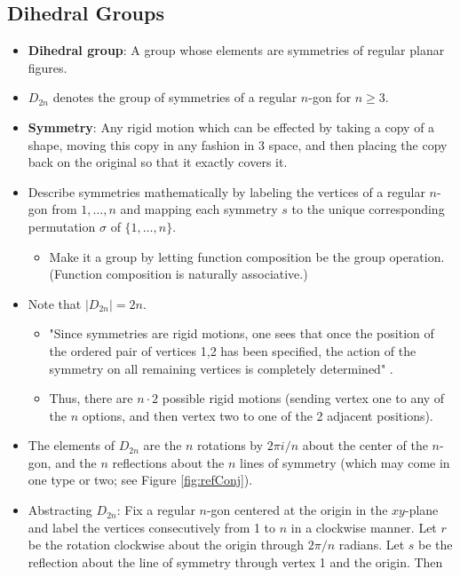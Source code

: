 \documentclass[../notes.tex]{subfiles}
\begin{document}
\subsection*{Dihedral Groups}
\begin{itemize}
    \item {}\textbf{Dihedral group}: A group whose elements are symmetries of regular planar figures.
    \item $D_{2n}$ denotes the group of symmetries of a regular $n$-gon for $n\geq 3$.
    \item \textbf{Symmetry}: Any rigid motion which can be effected by taking a copy of a shape, moving this copy in any fashion in 3 space, and then placing the copy back on the original so that it exactly covers it.
    \item Describe symmetries mathematically by labeling the vertices of a regular $n$-gon from $1,\dots,n$ and mapping each symmetry $s$ to the unique corresponding permutation $\sigma$ of $\{1,\dots,n\}$.
    \begin{itemize}
        \item Make it a group by letting function composition be the group operation. (Function composition is naturally associative.)
    \end{itemize}
    \item Note that $|D_{2n}|=2n$.
    \begin{itemize}
        \item "Since symmetries are rigid motions, one sees that once the position of the ordered pair of vertices 1,2 has been specified, the action of the symmetry on all remaining vertices is completely determined" \parencite[24]{bib:DummitFoote}.
        \item Thus, there are $n\cdot 2$ possible rigid motions (sending vertex one to any of the $n$ options, and then vertex two to one of the 2 adjacent positions).
    \end{itemize}
    \item The elements of $D_{2n}$ are the $n$ rotations by $2\pi i/n$ about the center of the $n$-gon, and the $n$ reflections about the $n$ lines of symmetry (which may come in one type or two; see Figure \ref{fig:refConj}).
    \item Abstracting $D_{2n}$: Fix a regular $n$-gon centered at the origin in the $xy$-plane and label the vertices consecutively from 1 to $n$ in a clockwise manner. Let $r$ be the rotation clockwise about the origin through $2\pi/n$ radians. Let $s$ be the reflection about the line of symmetry through vertex 1 and the origin. Then

\end{itemize}
\end{document}
